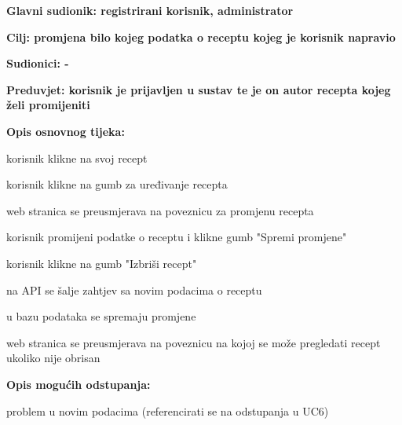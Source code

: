 					\noindent {}
					\begin{packed_item}
						\item \textbf{Glavni sudionik: registrirani korisnik, administrator}
						\item  \textbf{Cilj: promjena bilo kojeg podatka o receptu kojeg je korisnik napravio}
						\item  \textbf{Sudionici: -}
						\item  \textbf{Preduvjet: korisnik je prijavljen u sustav te je on autor recepta kojeg želi promijeniti}
						
						\item  \textbf{Opis osnovnog tijeka:}
						\item[] \begin{packed_enum}
							\item korisnik klikne na svoj recept
							\item korisnik klikne na gumb za uređivanje recepta
							\item web stranica se preusmjerava na poveznicu za promjenu recepta
							\item[4.a] korisnik promijeni podatke o receptu i klikne gumb "Spremi promjene"
							\item[4.b] korisnik klikne na gumb "Izbriši recept"
							\item[5.] na API se šalje zahtjev sa novim podacima o receptu
							\item[6.] u bazu podataka se spremaju promjene
							\item[7.] web stranica se preusmjerava na poveznicu na kojoj se može pregledati recept ukoliko nije obrisan
						\end{packed_enum}
						
						\item  \textbf{Opis mogućih odstupanja:}
						\item[] \begin{packed_item}							
							\item[7.a] problem u novim podacima (referencirati se na odstupanja u UC6)
						\end{packed_item}
					\end{packed_item}



